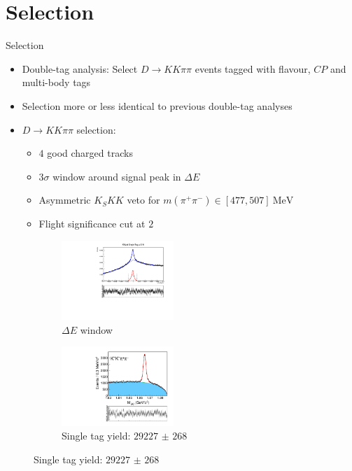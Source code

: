 \documentclass{beamer}
\begin{document}
\section{Selection}
\begin{frame}{Selection}
  \begin{itemize}
    \setlength\itemsep{0.7em}
    \item{Double-tag analysis: Select $D\to KK\pi\pi$ events tagged with flavour, $C\!P$ and multi-body tags}
    \item{Selection more or less identical to previous double-tag analyses}
    \item{$D\to KK\pi\pi$ selection:}
    \begin{itemize}
      \item{$4$ good charged tracks}
      \item{$3\sigma$ window around signal peak in $\Delta E$}
      \item{Asymmetric $K_SKK$ veto for $m(\pi^+\pi^-)\in[477, 507]~\si{\mega\eV}$}
      \item{Flight significance cut at $2$}
    \end{itemize}
  \end{itemize}
  \begin{figure}
    \centering
    \begin{subfigure}{0.5\textwidth}
      \centering
      \includegraphics[height=3cm,trim={0 3.8cm 0 0},clip=true]{Plots/KKpipi_SingleTag_DeltaE_Plot.pdf}
      \caption{$\Delta E$ window}
    \end{subfigure}%
    \begin{subfigure}{0.5\textwidth}
      \centering
      \includegraphics[height=3cm,trim={0 5.0cm 0 0},clip=true]{Plots/KKpipi_SingleTag_MBC_Plot.pdf}
      \caption{Single tag yield: $\SI{29227(268)}{}$}
    \end{subfigure}
  \end{figure}
\end{frame}
\end{document}
